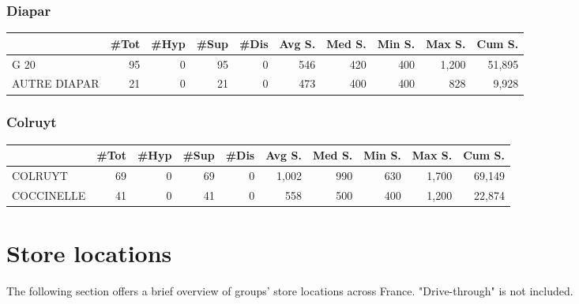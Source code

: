 \documentclass[11pt]{article}
\begin{document}
\subsubsection{Diapar}

\begin{table}[H]
\footnotesize
\setlength{\tabcolsep}{2pt}

\begin{tabular}{lrrrrrrrrr}
\toprule
\toprule
{} &       \#Tot &       \#Hyp &       \#Sup &       \#Dis &     Avg S. &     Med S. &     Min S. &     Max S. &     Cum S. \\
\midrule
G 20         &         95 &          0 &         95 &          0 &        546 &        420 &        400 &      1,200 &     51,895 \\
AUTRE DIAPAR &         21 &          0 &         21 &          0 &        473 &        400 &        400 &        828 &      9,928 \\
\bottomrule
\end{tabular}

\end{table}


\subsubsection{Colruyt}

\begin{table}[H]
\footnotesize
\setlength{\tabcolsep}{2pt}

\begin{tabular}{lrrrrrrrrr}
\toprule
\toprule
{} &       \#Tot &       \#Hyp &       \#Sup &       \#Dis &     Avg S. &     Med S. &     Min S. &     Max S. &     Cum S. \\
\midrule
COLRUYT    &         69 &          0 &         69 &          0 &      1,002 &        990 &        630 &      1,700 &     69,149 \\
COCCINELLE &         41 &          0 &         41 &          0 &        558 &        500 &        400 &      1,200 &     22,874 \\
\bottomrule
\end{tabular}

\end{table}

\section{Store locations}

The following section offers a brief overview of groups' store locations across France. "Drive-through" is not included.
\end{document}
